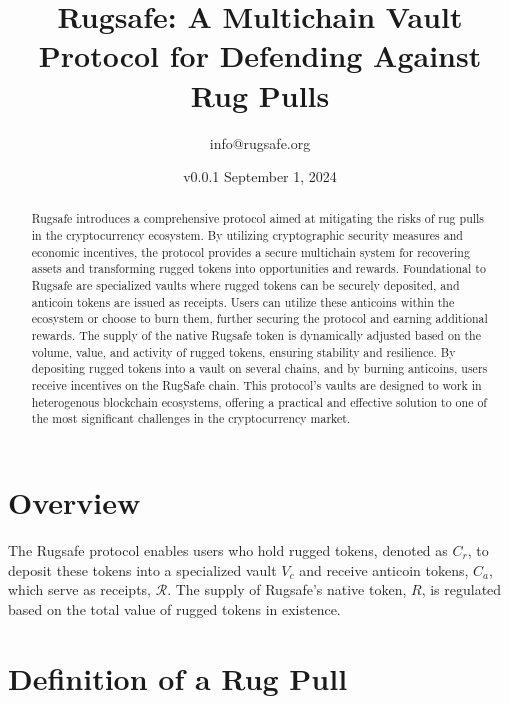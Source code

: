 \documentclass{article}
\title{Rugsafe: A Multichain Vault Protocol for Defending Against Rug Pulls}
\author{info@rugsafe.org}
\date{v0.0.1 September 1, 2024}
\begin{document}
\maketitle


\begin{abstract}
Rugsafe introduces a comprehensive protocol aimed at mitigating the risks of rug pulls in the cryptocurrency ecosystem. By utilizing cryptographic security measures and economic incentives, the protocol provides a secure multichain system for recovering assets and transforming rugged tokens into opportunities and rewards. Foundational to Rugsafe are specialized vaults where rugged tokens can be securely deposited, and anticoin tokens are issued as receipts. Users can utilize these anticoins within the ecosystem or choose to burn them, further securing the protocol and earning additional rewards. The supply of the native Rugsafe token is dynamically adjusted based on the volume, value, and activity of rugged tokens, ensuring stability and resilience. By depositing rugged tokens into a vault on several chains, and by burning anticoins, users receive incentives on the RugSafe chain. This protocol's vaults are designed to work in heterogenous blockchain ecosystems, offering a practical and effective solution to one of the most significant challenges in the cryptocurrency market. 
\end{abstract}





\tableofcontents






\section{Overview}

The Rugsafe protocol enables users who hold rugged tokens, denoted as $C_r$, to deposit these tokens into a specialized vault $V_c$ and receive anticoin tokens, $C_a$,  which serve as receipts, \(\mathcal{R} \). The supply of Rugsafe's native token, $R$, is regulated based on the total value of rugged tokens in existence.





\section{Definition of a Rug Pull}
\end{document}
